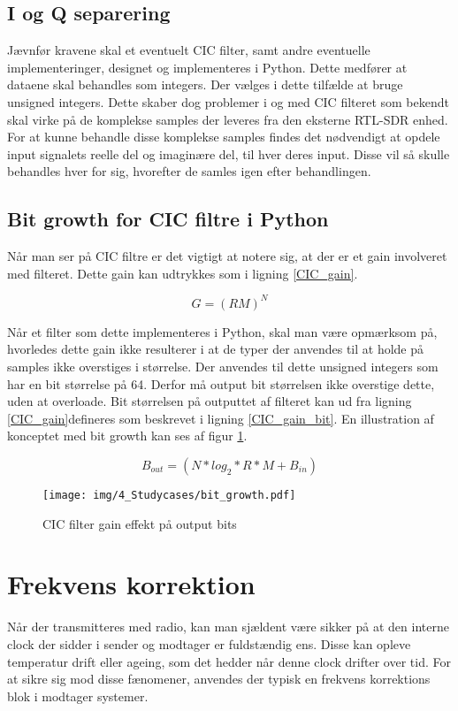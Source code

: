 \begin{appendices}
\subsection{I og Q separering}
Jævnfør kravene skal et eventuelt CIC filter, samt andre eventuelle implementeringer, designet og implementeres i Python. Dette medfører at dataene skal behandles som integers. Der vælges i dette tilfælde at bruge unsigned integers. Dette skaber dog problemer i og med CIC filteret som bekendt skal virke på de komplekse samples der leveres fra den eksterne RTL-SDR enhed. For at kunne behandle disse komplekse samples findes det nødvendigt at opdele input signalets reelle del og imaginære del, til hver deres input. Disse vil så skulle behandles hver for sig, hvorefter de samles igen efter behandlingen. 

\pagebreak
\subsection{Bit growth for CIC filtre i Python}
Når man ser på CIC filtre er det vigtigt at notere sig, at der er et gain involveret med filteret. Dette gain kan udtrykkes som i ligning \ref{CIC_gain}. 

\begin{equation} \label{CIC_gain}
G = (RM)^N
\end{equation}

Når et filter som dette implementeres i Python, skal man være opmærksom på, hvorledes dette gain ikke resulterer i at de typer der anvendes til at holde på samples ikke overstiges i størrelse. Der anvendes til dette unsigned integers som har en bit størrelse på 64. Derfor må output bit størrelsen ikke overstige dette, uden at overloade. Bit størrelsen på outputtet af filteret kan ud fra ligning \ref{CIC_gain}defineres som beskrevet i ligning \ref{CIC_gain_bit}. En illustration af konceptet med bit growth kan ses af figur \ref{fig:cic_growth_bits}.


\begin{equation} \label{CIC_gain_bit}
B_{out} = (N * log_2 * R * M + B_{in})
\end{equation}


\begin{figure}[H]
	\centering{}
	\texttt{[image: img/4\_Studycases/bit\_growth.pdf]}
	\caption{CIC filter gain effekt på output bits}
	\label{fig:cic_growth_bits}
\end{figure} 

\pagebreak
\section{Frekvens korrektion} \label{appendix::studycase::frekvenskorrektion}
Når der transmitteres med radio, kan man sjældent være sikker på at den interne clock der sidder i sender og modtager er fuldstændig ens. Disse kan opleve temperatur drift eller ageing, som det hedder når denne clock drifter over tid. For at sikre sig mod disse fænomener, anvendes der typisk en frekvens korrektions blok i modtager systemer. 


\end{appendices}
